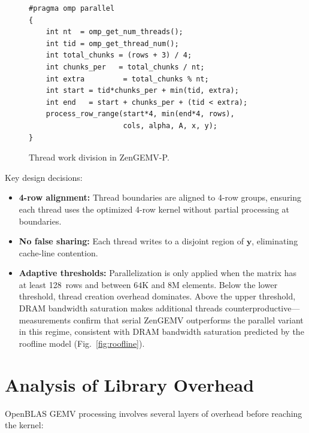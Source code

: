 \documentclass[conference]{IEEEtran}
\begin{document}
\begin{figure}[tbp]
\begin{verbatim}
#pragma omp parallel
{
    int nt  = omp_get_num_threads();
    int tid = omp_get_thread_num();
    int total_chunks = (rows + 3) / 4;
    int chunks_per   = total_chunks / nt;
    int extra         = total_chunks % nt;
    int start = tid*chunks_per + min(tid, extra);
    int end   = start + chunks_per + (tid < extra);
    process_row_range(start*4, min(end*4, rows),
                      cols, alpha, A, x, y);
}
\end{verbatim}
\caption{Thread work division in ZenGEMV-P.}
\label{lst:omp}
\end{figure}

Key design decisions:
\begin{itemize}
\item \textbf{4-row alignment:} Thread boundaries are aligned to 4-row groups,
      ensuring each thread uses the optimized 4-row kernel without partial
      processing at boundaries.
\item \textbf{No false sharing:} Each thread writes to a disjoint region of
      $\mathbf{y}$, eliminating cache-line contention.
\item \textbf{Adaptive thresholds:} Parallelization is only applied when
      the matrix has at least 128~rows and between $64\text{K}$ and $8\text{M}$
      elements. Below the lower threshold, thread creation overhead dominates.
      Above the upper threshold, DRAM bandwidth saturation makes additional
      threads counterproductive---measurements confirm that serial ZenGEMV
      outperforms the parallel variant in this regime, consistent with DRAM
      bandwidth saturation predicted by the roofline model (Fig.~\ref{fig:roofline}).
\end{itemize}


\section{Analysis of Library Overhead}

OpenBLAS GEMV processing involves several layers of overhead before reaching the kernel:
\end{document}
